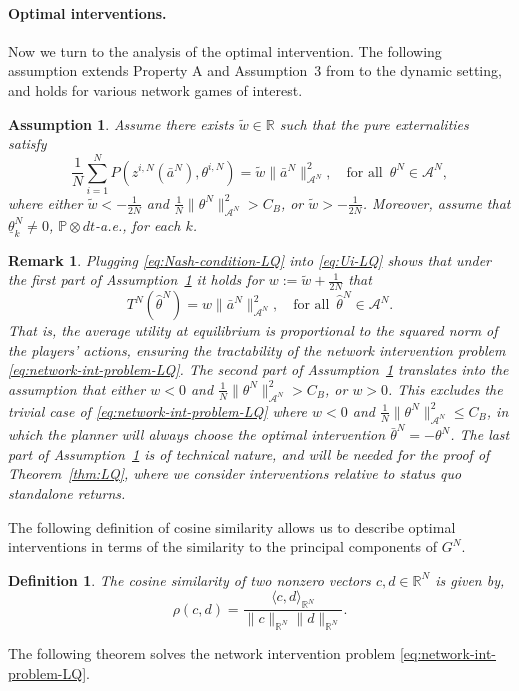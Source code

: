\documentclass[11pt]{article}
\def\P{\mathbb{P}}
\newcommand{\R}{{\mathbb R}}
\newtheorem{remark}[theorem]{Remark}
\newtheorem{definition}[theorem]{Definition}
\newtheorem{assumption}[theorem]{Assumption}
\numberwithin{equation}{section}
\begin{document}

\paragraph{Optimal interventions.}  Now we turn to the analysis of the optimal intervention. The following assumption extends Property A and Assumption~3 from \cite{galeotti2020targeting} to the dynamic setting, and holds for various network games of interest. 

\begin{assumption}\label{assum:property}
Assume there exists $\tilde{w}\in\R$ such that the pure externalities satisfy 
$$
\frac{1}{N}\sum_{i=1}^N P\left(z^{i,N}(\bar{a}^N),\theta^{i,N}\right)=\tilde{w} \|\bar a^N\|^2_{\mathcal{A}^N},\quad\textrm{for all }\,\theta^N\in\mathcal{A}^N, 
$$
where either $\tilde{w}<-\frac{1}{2N}$ and $\frac{1}{N}\|\theta^N\|_{\mathcal{A}^N}^2> C_B$, or $\tilde{w}>-\frac{1}{2N}$. Moreover, assume that $\underline{\theta}^N_k\neq 0$, $\P \otimes dt$-a.e., for each $k$.
\end{assumption}

\begin{remark}\label{rem:property}
Plugging \eqref{eq:Nash-condition-LQ} into \eqref{eq:Ui-LQ} shows that under the first part of Assumption~\ref{assum:property} it holds for  $w :=\tilde{w}+\frac{1}{2N}$ that
$$
T^N(\hat\theta^N)=w\|\bar{a}^N\|_{\mathcal{A}^N}^2,\quad\textrm{for all }\,\hat{\theta}^N\in\mathcal{A}^N.
$$
That is, the average utility at equilibrium is proportional to the squared norm of the players' actions, ensuring the tractability of the network intervention problem \eqref{eq:network-int-problem-LQ}. The second part of Assumption~\ref{assum:property} translates into the assumption that either $w<0$ and $\frac{1}{N}\|\theta^N\|_{\mathcal{A}^N}^2> C_B$, or $w>0$. This excludes the trivial case of \eqref{eq:network-int-problem-LQ} where $w<0$ and $\frac{1}{N}\|\theta^N\|_{\mathcal{A}^N}^2\leq C_B$, in which the planner will always choose the optimal intervention $\bar\theta^N=-\theta^N$.  The last part of Assumption~\ref{assum:property} is of technical nature, and will be needed for the proof of Theorem~\ref{thm:LQ}, where we consider interventions relative to status quo standalone returns.
\end{remark}
The following definition of cosine similarity allows us to describe optimal interventions in terms of the similarity to the principal components of $G^N$.
\begin{definition}
The cosine similarity of two nonzero vectors $c,d\in\R^N$ is given by, 
$$
\rho(c, d) = \frac{\langle c , d\rangle_{\R^N}}{\|c\|_{\R^N} \|{d}\|_{\R^N}}.
$$
\end{definition}
The following theorem solves the network intervention problem \eqref{eq:network-int-problem-LQ}. 
\end{document}
